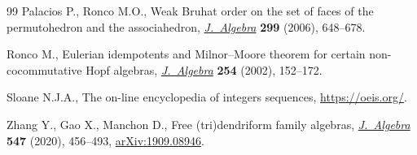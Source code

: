 \documentclass[pdftex]{sigma}
\numberwithin{equation}{section}
\theoremstyle{definition}
\theoremstyle{plain}
\begin{document}
\begin{thebibliography}{99}
Palacios P., Ronco M.O., Weak {B}ruhat order on the set of faces of the
 permutohedron and the associahedron, \href{https://doi.org/10.1016/j.jalgebra.2005.09.042}{\textit{J.~Algebra}} \textbf{299} (2006),
 648--678.

Ronco M., Eulerian idempotents and {M}ilnor--{M}oore theorem for certain
 non-cocommutative {H}opf algebras, \href{https://doi.org/10.1016/S0021-8693(02)00097-2}{\textit{J.~Algebra}} \textbf{254} (2002),
 152--172.

Sloane N.J.A., The on-line encyclopedia of integers sequences,
 \url{https://oeis.org/}.

Zhang Y., Gao X., Manchon D., Free (tri)dendriform family algebras,
 \href{https://doi.org/10.1016/j.jalgebra.2019.11.027}{\textit{J.~Algebra}} \textbf{547} (2020), 456--493, \href{https://arxiv.org/abs/1909.08946}{arXiv:1909.08946}.

\end{thebibliography}\LastPageEnding
\end{document}
